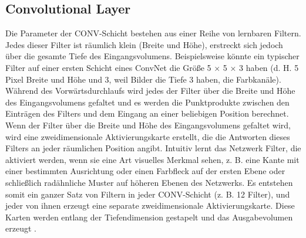 
    \subsection{Convolutional Layer}

    Die Parameter der CONV-Schicht bestehen aus einer Reihe von lernbaren Filtern. Jedes dieser Filter ist räumlich klein (Breite und Höhe), erstreckt sich jedoch über die gesamte Tiefe des Eingangsvolumens. Beispielsweise könnte ein typischer Filter auf einer ersten Schicht eines ConvNet die Größe 5 × 5 × 3 haben (d. H. 5 Pixel Breite und Höhe und 3, weil Bilder die Tiefe 3 haben, die Farbkanäle). Während des Vorwärtsdurchlaufs wird jedes der Filter über die Breite und Höhe des Eingangsvolumens gefaltet und es werden die Punktprodukte zwischen den Einträgen des Filters und dem Eingang an einer beliebigen Position berechnet. Wenn der Filter über die Breite und Höhe des Eingangsvolumens gefaltet wird, wird eine zweidimensionale Aktivierungskarte erstellt, die die Antworten dieses Filters an jeder räumlichen Position angibt. Intuitiv lernt das Netzwerk Filter, die aktiviert werden, wenn sie eine Art visuelles Merkmal sehen, z. B. eine Kante mit einer bestimmten Ausrichtung oder einen Farbfleck auf der ersten Ebene oder schließlich radähnliche Muster auf höheren Ebenen des Netzwerks. Es entstehen somit ein ganzer Satz von Filtern in jeder CONV-Schicht (z. B. 12 Filter), und jeder von ihnen erzeugt eine separate zweidimensionale Aktivierungskarte. Diese Karten werden entlang der Tiefendimension gestapelt und das Ausgabevolumen erzeugt \cite*{StanfordUniversityCoursecs231n2018a}.

